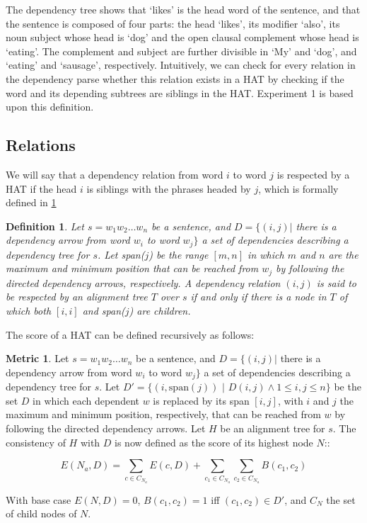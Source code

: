 \documentclass[a4paper, 11pt]{report}
\theoremstyle{definition}
\newtheorem{metric}{Metric}
\theoremstyle{plain}
\newtheorem{definition}{Definition}
\begin{document}
The dependency tree shows that `likes' is the head word of the sentence, and that the sentence is composed of four parts: the head `likes', its modifier `also', its noun subject whose head is `dog' and the open clausal complement whose head is `eating'. The complement and subject are further divisible in `My' and `dog', and `eating' and `sausage', respectively. Intuitively, we can check for every relation in the dependency parse whether this relation exists in a HAT by checking if the word and its depending subtrees are siblings in the HAT. Experiment 1 is based upon this definition.

\subsection{Relations}

We will say that a dependency relation from word $i$ to word $j$ is respected by a HAT if the head $i$ is siblings with the phrases headed by $j$, which is formally defined in \ref{def:respHAT}

\begin{definition}\label{def:respHAT}
Let $s = w_1 w_2 \dots w_n$ be a sentence, and $D = \{ (i,j) |$ there is a dependency arrow from word $w_i$ to word $w_j \}$ a set of dependencies describing a dependency tree for $s$. Let span($j$) be the range $[m,n]$ in which $m$ and $n$ are the maximum and minimum position that can be reached from $w_j$ by following the directed dependency arrows, respectively. A dependency relation $(i,j)$ is said to be respected by an alignment tree $T$ over $s$ if and only if there is a node in $T$ of which both $[i,i]$ and span($j$) are children.
\end{definition}

The score of a HAT can be defined recursively as follows:

\begin{metric}\label{metric:m1}
Let $s = w_1 w_2 \dots w_n$ be a sentence, and $D = \{ (i,j) |$ there is a dependency arrow from word $w_i$ to word $w_j \}$ a set of dependencies describing a dependency tree for $s$. Let $D' = \{ (i,\textrm{span}(j))$ $|$ $D(i,j) \land 1 \leq i,j \leq n \}$ be the set $D$ in which each dependent $w$ is replaced by its span $[i,j]$, with $i$ and $j$ the maximum and minimum position, respectively, that can be reached from $w$ by following the directed dependency arrows. Let $H$ be an alignment tree for $s$. The consistency of $H$ with $D$ is now defined as the score of its highest node $N$::

$$
E(N_a,D) = \sum_{c\in C_{N_a}} E(c,D)+ \sum_{c_1\in C_{N_a}} \sum_{c_2\in C_{N_a}} B(c_1,c_2)
$$

\noindent With base case $E(N,D) = 0$, $B(c_1,c_2) = 1$ iff  $(c_1,c_2)\in D'$, and $C_N$ the set of child nodes of $N$.
\end{metric}
\end{document}
